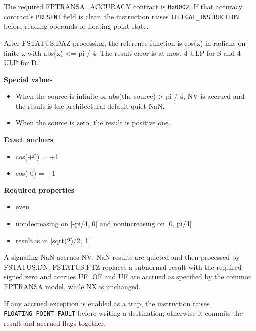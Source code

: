 The required FPTRANSA\_ACCURACY contract is \texttt{0x0002}. If that accuracy contract's \texttt{PRESENT} field is clear, the instruction raises \texttt{ILLEGAL\_INSTRUCTION} before reading operands or floating-point state.

After FSTATUS.DAZ processing, the reference function is cos(x) in radians on finite x with abs(x) \textless{}= pi / 4. The result error is at most 4 ULP for S and 4 ULP for D.

\textbf{Special values}\par
\begin{itemize}
\item When the source is infinite or abs(the source) \textgreater{} pi / 4, NV is accrued and the result is the architectural default quiet NaN.
\item When the source is zero, the result is positive one.
\end{itemize}

\textbf{Exact anchors}\par
\begin{itemize}
\item cos(+0) = +1
\item cos(-0) = +1
\end{itemize}

\textbf{Required properties}\par
\begin{itemize}
\item even
\item nondecreasing on [-pi/4, 0] and nonincreasing on [0, pi/4]
\item result is in [sqrt(2)/2, 1]
\end{itemize}

A signaling NaN accrues NV. NaN results are quieted and then processed by FSTATUS.DN. FSTATUS.FTZ replaces a subnormal result with the required signed zero and accrues UF. OF and UF are accrued as specified by the common FPTRANSA model, while NX is unchanged.

If any accrued exception is enabled as a trap, the instruction raises \texttt{FLOATING\_POINT\_FAULT} before writing a destination; otherwise it commits the result and accrued flags together.

